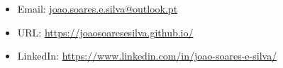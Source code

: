 \documentclass[10pt,a4paper,oneside]{article}
\newlength{\datewidth}
\newlength{\textindent}
\begin{document}
	
	
	\vspace{5mm}
	
	\begin{itemize}
		\item[\hspace{\datewidth}] \parbox[t]{\dimexpr\linewidth-\datewidth-\textindent}{Email: \href{mailto:joao.soares.e.silva@outlook.pt}{joao.soares.e.silva@outlook.pt}}
		\item[\hspace{\datewidth}] \parbox[t]{\dimexpr\linewidth-\datewidth-\textindent}{URL: \url{https://joaosoaresesilva.github.io/}}
		\item[\hspace{\datewidth}] \parbox[t]{\dimexpr\linewidth-\datewidth-\textindent}{LinkedIn: \url{https://www.linkedin.com/in/joao-soares-e-silva/}}
	\end{itemize}
\end{document}
